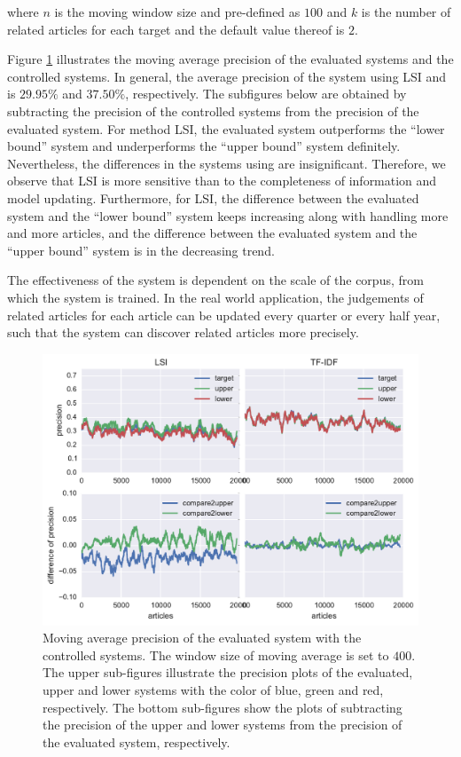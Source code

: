 where $n$ is the moving window size and pre-defined as $100$ and $k$ is the number of related articles for each target and the default value thereof is $2$. 

Figure \ref{fig:predict_inc} illustrates the moving average precision of the evaluated systems and the controlled systems. In general, the average precision of the system using LSI and \tfidf{} is $29.95\%$ and $37.50\%$, respectively. The subfigures below are obtained by subtracting the precision of the controlled systems from the precision of the evaluated system. For method LSI, the evaluated system outperforms the ``lower bound'' system and underperforms the ``upper bound'' system definitely. Nevertheless, the differences in the systems using \tfidf{} are insignificant. Therefore, we observe that LSI is more sensitive than \tfidf{} to the completeness of information and model updating. Furthermore, for LSI, the difference between the evaluated system and the ``lower bound'' system keeps increasing along with handling more and more articles, and the difference between the evaluated system and the ``upper bound'' system is in the decreasing trend. 

The effectiveness of the system is dependent on the scale of the corpus, from which the system is trained. In the real world application, the judgements of related articles for each article can be updated every quarter or every half year, such that the system can discover related articles more precisely. 

\clearpage

\begin{figure}[!htb]
    \centering
    \includegraphics[width=\textwidth]{fig/precision_inc}
    \caption[Moving average precision of the evaluated system with the controlled systems]{Moving average precision of the evaluated system with the controlled systems. The window size of moving average is set to $400$. The upper sub-figures illustrate the precision plots of the evaluated, upper and lower systems with the color of blue, green and red, respectively. The bottom sub-figures show the plots of subtracting the precision of the upper and lower systems from the precision of the evaluated system, respectively.}
    \label{fig:predict_inc}
\end{figure}

